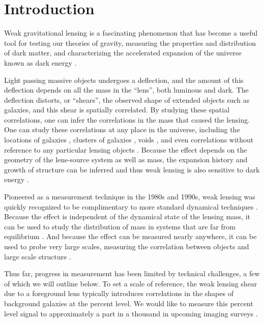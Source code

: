 \documentclass[iop]{emulateapj}
\begin{document}

\section{Introduction} \label{sec:intro}

Weak gravitational lensing is a fascinating phenomenon that has become a useful
tool for testing our theories of gravity, measuring the properties and
distribution of dark matter, and characterizing the accelerated expansion 
of the universe known as dark energy \citep[for a review, see][]{HoekstraJain2008}.

Light passing massive objects undergoes a deflection, and the amount of this
deflection depends on all the mass in the ``lens'', both luminous and dark.
The deflection distorts, or ``shears'', the observed shape of extended objects
such as galaxies, and this shear is spatially correlated.  By studying these
spatial correlations, one can infer the correlations in the mass that caused the
lensing. One can study these correlations at any place in the universe,
including the locations of galaxies \citep{Mandelbaum06}, clusters of galaxies
\citep{JohnstonLensing07}, voids \citep{MelchiorVoids2014}, and even
correlations without reference to any particular lensing objects
\citep{CFHTCosmicShear2013}.  Because the effect depends on the geometry of the
lens-source system as well as mass, the expansion history and growth of
structure can be inferred  and thus weak lensing is also sensitive to dark
energy \citep{HeymansTomography2013}.


Pioneered as a measurement technique in the 1980s and 1990s, weak lensing was
quickly recognized to be complimentary to more standard dynamical techniques
\citep{Tyson84}.  Because the effect is independent of the dynamical state of
the lensing mass, it can be used to study the distribution of mass in systems
that are far from equilibrium \citep{CloweDMProof06}.   And because the effect
can be measured nearly anywhere, it can be used to probe very large scales,
measuring the correlation between objects and large scale structure
\citep{SheldonLensing09}.

Thus far, progress in measurement has been limited by technical challenges, a
few of which we will outline below.  To set a scale of reference, the weak
lensing shear due to a foreground lens typically introduces correlations in the
shapes of background galaxies at the percent level.    We would like to measure
this percent level signal to approximately a part in a thousand in upcoming
imaging surveys \citep{HutererSystematics06}.
\end{document}
